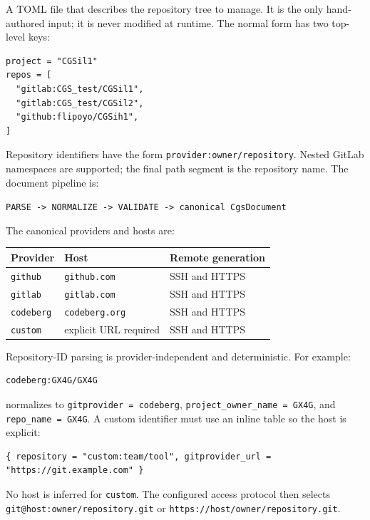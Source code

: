 A TOML file that describes the repository tree to manage. It is the only
hand-authored input; it is never modified at runtime.  The normal form has two
top-level keys:

\begin{lstlisting}
project = "CGSil1"
repos = [
  "gitlab:CGS_test/CGSil1",
  "gitlab:CGS_test/CGSil2",
  "github:flipoyo/CGSih1",
]
\end{lstlisting}

Repository identifiers have the form
\texttt{provider:owner/repository}. Nested GitLab namespaces are supported;
the final path segment is the repository name. The document pipeline is:

\begin{center}
\texttt{PARSE -> NORMALIZE -> VALIDATE -> canonical CgsDocument}
\end{center}

The canonical providers and hosts are:

\begin{center}
\begin{tabular}{lll}
\textbf{Provider} & \textbf{Host} & \textbf{Remote generation} \\
\hline
\texttt{github}   & \texttt{github.com}   & SSH and HTTPS \\
\texttt{gitlab}   & \texttt{gitlab.com}   & SSH and HTTPS \\
\texttt{codeberg} & \texttt{codeberg.org} & SSH and HTTPS \\
\texttt{custom}   & explicit URL required & SSH and HTTPS \\
\end{tabular}
\end{center}

Repository-ID parsing is provider-independent and deterministic. For example:

\begin{lstlisting}
codeberg:GX4G/GX4G
\end{lstlisting}

normalizes to \texttt{gitprovider = codeberg},
\texttt{project\_owner\_name = GX4G}, and
\texttt{repo\_name = GX4G}. A custom identifier must use an inline table so
the host is explicit:

\begin{lstlisting}
{ repository = "custom:team/tool", gitprovider_url = "https://git.example.com" }
\end{lstlisting}

No host is inferred for \texttt{custom}. The configured access protocol then
selects \texttt{git@host:owner/repository.git} or
\texttt{https://host/owner/repository.git}.

